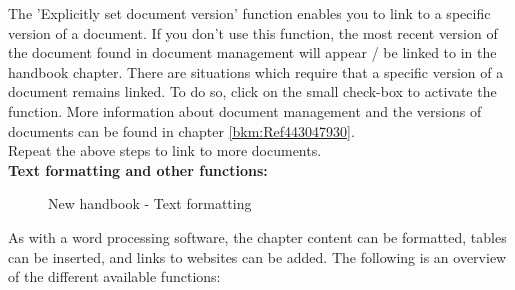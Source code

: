 The 'Explicitly set document version' function  enables you to link to a specific version of a document. If you don't use this function, the most recent version of the document found in document management will appear / be linked to in the handbook chapter. There are situations which require that a specific version of a document remains linked. To do so, click on the small check-box to activate the function. More information about document management and the versions of documents can be found in chapter \ref{bkm:Ref443047930}. \\

Repeat the above steps to link to more documents. \\

\textbf{Text formatting and other functions:}

\begin{figure}[H]
\caption{New handbook - Text formatting}
\end{figure}

As with a word processing software, the chapter content can be formatted, tables can be inserted, and links to websites can be added. The following is an overview of the different available functions: \\


